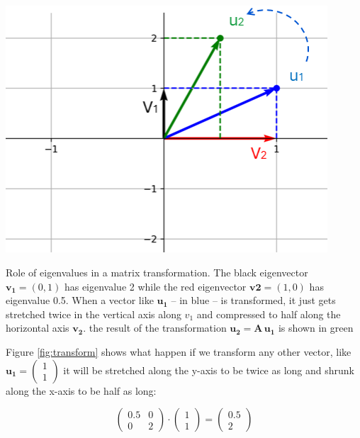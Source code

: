 \documentclass{tufte-book} %
\begin{document}
\begin{marginfigure}
	\begin{center}
		\includegraphics[width=0.9\textwidth]{transform}	
	\end{center}
	\caption{Role of eigenvalues in a matrix transformation. The black eigenvector $\mathbf{v_1} = (0,1)$ has eigenvalue 2 while the red eigenvector $\mathbf{v2}=(1,0)$ has eigenvalue 0.5. When a vector like $\mathbf{u_1}$ -- in blue -- is transformed, it just gets stretched twice in the vertical axis along $v_1$ and compressed to half along the horizontal axis $\mathbf{v_2}$. the result of the transformation $\mathbf{u_2} = \mathbf{A} \, \mathbf{u_1}$ is shown in green}
	\label{fig:transform}
\end{marginfigure}

Figure \ref{fig:transform} shows what happen if we transform any other vector, like $\mathbf{u_1}=\begin{pmatrix}  1\\ 1 \end{pmatrix}$ it will be stretched along the y-axis to be twice as long and shrunk along the x-axis to be half as long:

\begin{equation}
	\begin{pmatrix} 0.5 & 0\\ 0 &  2 \end{pmatrix} \cdot \begin{pmatrix}  1\\ 1 \end{pmatrix} = \begin{pmatrix}  0.5\\ 2 \end{pmatrix}
\end{equation}
\end{document}
